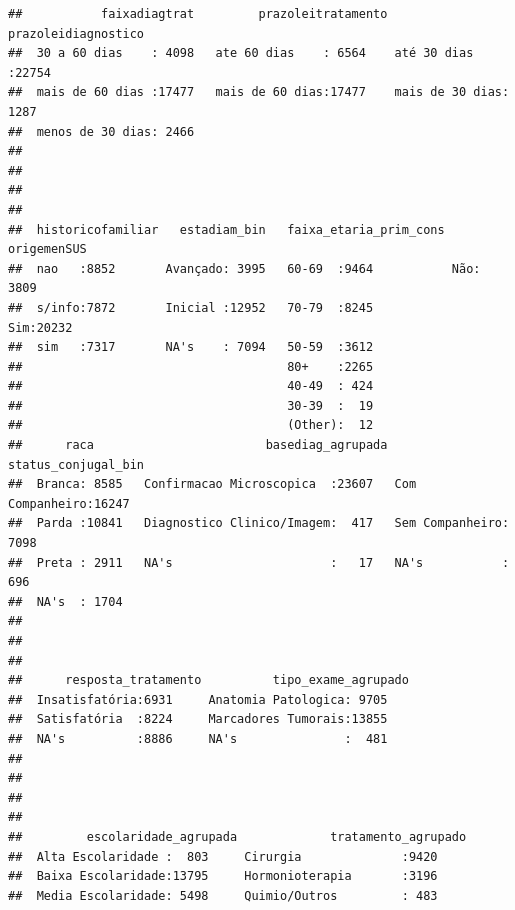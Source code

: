 \documentclass[
]{article}
\begin{document}
\begin{verbatim}
##           faixadiagtrat         prazoleitratamento      prazoleidiagnostico
##  30 a 60 dias    : 4098   ate 60 dias    : 6564    até 30 dias    :22754   
##  mais de 60 dias :17477   mais de 60 dias:17477    mais de 30 dias: 1287   
##  menos de 30 dias: 2466                                                    
##                                                                            
##                                                                            
##                                                                            
##                                                                            
##  historicofamiliar   estadiam_bin   faixa_etaria_prim_cons origemenSUS
##  nao   :8852       Avançado: 3995   60-69  :9464           Não: 3809  
##  s/info:7872       Inicial :12952   70-79  :8245           Sim:20232  
##  sim   :7317       NA's    : 7094   50-59  :3612                      
##                                     80+    :2265                      
##                                     40-49  : 424                      
##                                     30-39  :  19                      
##                                     (Other):  12                      
##      raca                        basediag_agrupada      status_conjugal_bin
##  Branca: 8585   Confirmacao Microscopica  :23607   Com Companheiro:16247   
##  Parda :10841   Diagnostico Clinico/Imagem:  417   Sem Companheiro: 7098   
##  Preta : 2911   NA's                      :   17   NA's           :  696   
##  NA's  : 1704                                                              
##                                                                            
##                                                                            
##                                                                            
##      resposta_tratamento          tipo_exame_agrupado
##  Insatisfatória:6931     Anatomia Patologica: 9705   
##  Satisfatória  :8224     Marcadores Tumorais:13855   
##  NA's          :8886     NA's               :  481   
##                                                      
##                                                      
##                                                      
##                                                      
##         escolaridade_agrupada             tratamento_agrupado
##  Alta Escolaridade :  803     Cirurgia              :9420    
##  Baixa Escolaridade:13795     Hormonioterapia       :3196    
##  Media Escolaridade: 5498     Quimio/Outros         : 483    

\end{verbatim}
\end{document}
